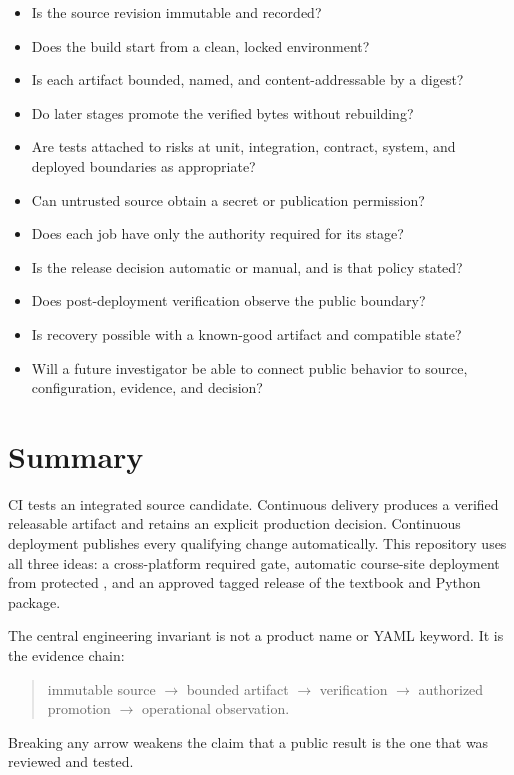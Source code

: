 \begin{itemize}
  \item Is the source revision immutable and recorded?
  \item Does the build start from a clean, locked environment?
  \item Is each artifact bounded, named, and content-addressable by a digest?
  \item Do later stages promote the verified bytes without rebuilding?
  \item Are tests attached to risks at unit, integration, contract, system, and
  deployed boundaries as appropriate?
  \item Can untrusted source obtain a secret or publication permission?
  \item Does each job have only the authority required for its stage?
  \item Is the release decision automatic or manual, and is that policy stated?
  \item Does post-deployment verification observe the public boundary?
  \item Is recovery possible with a known-good artifact and compatible state?
  \item Will a future investigator be able to connect public behavior to source,
  configuration, evidence, and decision?
\end{itemize}

\section{Summary}

CI tests an integrated source candidate. Continuous delivery produces a
verified releasable artifact and retains an explicit production decision.
Continuous deployment publishes every qualifying change automatically. This
repository uses all three ideas: a cross-platform required gate, automatic
course-site deployment from protected , and an approved tagged
release of the textbook and Python package.

The central engineering invariant is not a product name or YAML keyword. It is
the evidence chain:

\begin{quote}
immutable source $\longrightarrow$ bounded artifact $\longrightarrow$
verification $\longrightarrow$ authorized promotion $\longrightarrow$
operational observation.
\end{quote}

Breaking any arrow weakens the claim that a public result is the one that was
reviewed and tested.

